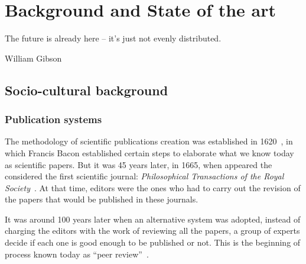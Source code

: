 \chapter{Background and State of the art}

\begin{FraseCelebre}
  \begin{Frase}
    The future is already here – it's just not evenly distributed.
  \end{Frase}
  \begin{Fuente}
    William Gibson
  \end{Fuente}
\end{FraseCelebre}


\section{Socio-cultural background}
\label{scb}
\subsection{Publication systems}
\label{scb:ps}
The methodology of scientific publications creation was established in
1620~\cite{bacon1878novum}, in which Francis Bacon established certain steps to
elaborate what we know today as scientific papers. But it was 45 years later, in
1665, when appeared the considered the first scientific journal:
\emph{Philosophical Transactions of the Royal
  Society}~\cite{kronick1976history}. At that time, editors were the ones who
had to carry out the revision of the papers that would be published in these
journals.


It was around 100 years later when an alternative system was adopted, instead of
charging the editors with the work of reviewing all the papers, a group of
experts decide if each one is good enough to be published or not. This is the
beginning of process known today as ``peer review''~\cite{spier2002history}.

